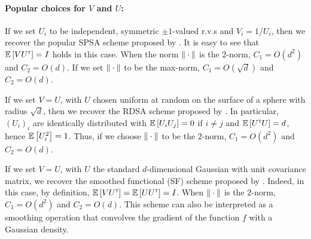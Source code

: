 \paragraph{Popular choices for $V$ and $U$:}
\begin{inparaenum}[$\bullet$]
 \item If we set $U_i$ to be independent, symmetric $\pm 1$-valued r.v.s and $V_i = 1/U_i$, then we recover the popular SPSA scheme proposed by \cite{spall1992multivariate}.
It is easy to see that $\mathbb{E}\left[  V U^\mathsf{\scriptscriptstyle T} \right] = I$ holds in this case.
 When the norm $\|\cdot\|$ is the $2$-norm, $C_1 = O(d^2)$ and $C_2 = O(d)$. If we set $\|\cdot\|$ to be the max-norm, $C_1 = O(\sqrt{d})$ and $C_2 = O(d)$.
 \item If we set $V=U$, with $U$ chosen uniform at random on the surface of a sphere with radius $\sqrt{d}$,
 then we recover the RDSA scheme proposed by  \citeauthor{kushcla} \citep[cf. pp.~58--60][]{kushcla}.
 In particular, $(U_i)_i$ are identically distributed with $\mathbb{E}\left[ U_i U_j \right] = 0$ if $i\ne j$ and $\mathbb{E}\left[ U^\mathsf{\scriptscriptstyle T} U \right] = d$, hence $\mathbb{E}\left[U_i^2\right] = 1$. Thus, if we choose $\|\cdot\|$ to be the $2$-norm, $C_1 = O( d^2 )$ and $C_2 = O(d)$.
 \item If we set $V=U$, with $U$ the standard $d$-dimensional Gaussian with unit covariance matrix, we recover the smoothed functional (SF) scheme proposed by \cite{katkul}.
Indeed, in this case, by definition, $\mathbb{E}\left[VU^\mathsf{\scriptscriptstyle T}\right] = \mathbb{E}\left[U U^\mathsf{\scriptscriptstyle T} \right] = I$.
When $\|\cdot\|$ is the $2$-norm, $C_1 = O(d^2)$
 and $C_2 = O( d)$.
 This scheme can also be interpreted as a smoothing operation that  convolves the gradient of the function $f$ with a Gaussian density.
\end{inparaenum}




